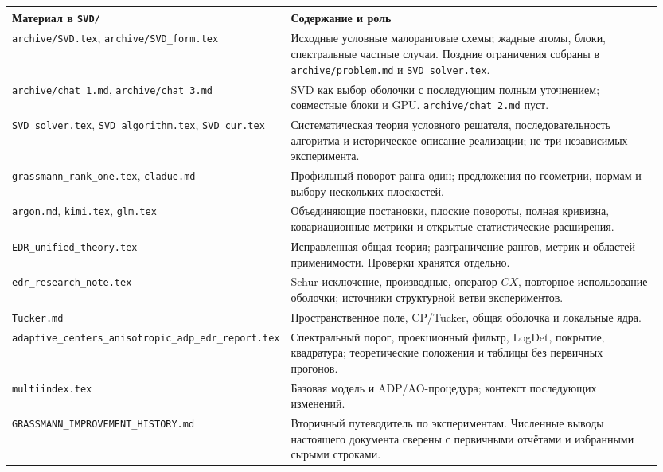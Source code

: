\documentclass[11pt,a4paper]{article}
\numberwithin{equation}{section}
\newcommand{\file}[1]{\nolinkurl{#1}}
\begin{document}
\small
\begin{longtable}{@{}>{\raggedright\arraybackslash}p{0.31\linewidth}>{\raggedright\arraybackslash}p{0.64\linewidth}@{}}
\toprule
Материал в \file{SVD/} & Содержание и роль\\
\midrule
\endhead
\file{archive/SVD.tex}, \file{archive/SVD_form.tex}
 & Исходные условные малоранговые схемы; жадные атомы, блоки,
 спектральные частные случаи. Поздние ограничения собраны в
 \file{archive/problem.md} и \file{SVD_solver.tex}.\\
\file{archive/chat_1.md}, \file{archive/chat_3.md}
 & SVD как выбор оболочки с последующим полным уточнением;
 совместные блоки и GPU. \file{archive/chat_2.md} пуст.\\
\file{SVD_solver.tex}, \file{SVD_algorithm.tex}, \file{SVD_cur.tex}
 & Систематическая теория условного решателя, последовательность
 алгоритма и историческое описание реализации; не три независимых эксперимента.\\
\file{grassmann_rank_one.tex}, \file{cladue.md}
 & Профильный поворот ранга один; предложения по геометрии,
 нормам и выбору нескольких плоскостей.\\
\file{argon.md}, \file{kimi.tex}, \file{glm.tex}
 & Объединяющие постановки, плоские повороты, полная кривизна,
 ковариационные метрики и открытые статистические расширения.\\
\file{EDR_unified_theory.tex}
 & Исправленная общая теория; разграничение рангов, метрик
 и областей применимости. Проверки хранятся отдельно.\\
\file{edr_research_note.tex}
 & Schur-исключение, производные, оператор $CX$, повторное
 использование оболочки; источники структурной ветви экспериментов.\\
\file{Tucker.md}
 & Пространственное поле, CP/Tucker, общая оболочка и локальные ядра.\\
\file{adaptive_centers_anisotropic_adp_edr_report.tex}
 & Спектральный порог, проекционный фильтр, LogDet, покрытие,
 квадратура; теоретические положения и таблицы без первичных прогонов.\\
\file{multiindex.tex}
 & Базовая модель и ADP/AO-процедура; контекст последующих изменений.\\
\file{GRASSMANN_IMPROVEMENT_HISTORY.md}
 & Вторичный путеводитель по экспериментам. Численные выводы
 настоящего документа сверены с первичными отчётами и избранными сырыми строками.\\
\bottomrule
\end{longtable}
\normalsize
\end{document}
